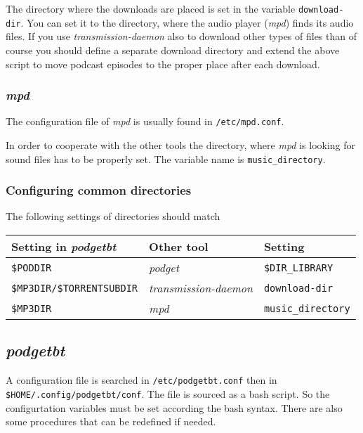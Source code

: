 The directory where the downloads are placed is set in the 
variable \texttt{download-dir}. You can set it to the 
directory, where the audio player (\emph{mpd}) finds its
audio files.
If you use \emph{transmission-daemon} also to download other 
types of files than of course you should define a separate
download directory and extend the above script to
move podcast episodes to the proper place after each download.

\subsubsection*{\emph{mpd}}
The configuration file of \emph{mpd} is 
usually found in \texttt{/etc/mpd.conf}.

In order to cooperate with the other tools
the directory, where \emph{mpd} is looking 
for sound files has to be properly set.
The variable name is \texttt{music\_directory}.

\subsubsection*{Configuring common directories}

The following settings of directories should match 

\begin{tabular}{|l|l|l|}
  \hline
  Setting in \emph{podgetbt} & Other tool  & Setting \\
  \hline
  \texttt{\$PODDIR} & \emph{podget} & \texttt{\$DIR\_LIBRARY} \\
  \texttt{\$MP3DIR/\$TORRENTSUBDIR} &
  \emph{transmission-daemon}
  & \texttt{download-dir} \\
  \texttt{\$MP3DIR} & \emph{mpd}    & \texttt{music\_directory}\\  
  \hline
\end{tabular}

\subsection*{\emph{podgetbt}}
\sloppy
A configuration file is searched in 
\texttt{/etc/podgetbt.conf} then in 
\texttt{\$HOME/.config/podgetbt/conf}.
The file is sourced as a bash script. 
So the configurtation variables must be set according the bash syntax.
There are also some procedures that can be redefined if needed.


